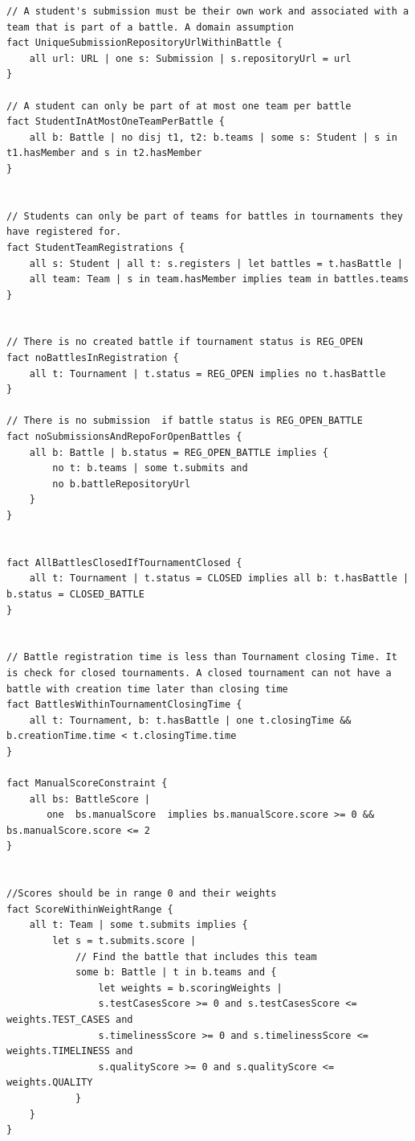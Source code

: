 \begin{lstlisting}[language=alloy]
// A student's submission must be their own work and associated with a team that is part of a battle. A domain assumption
fact UniqueSubmissionRepositoryUrlWithinBattle {
    all url: URL | one s: Submission | s.repositoryUrl = url
}

// A student can only be part of at most one team per battle
fact StudentInAtMostOneTeamPerBattle {
    all b: Battle | no disj t1, t2: b.teams | some s: Student | s in t1.hasMember and s in t2.hasMember
}


// Students can only be part of teams for battles in tournaments they have registered for.
fact StudentTeamRegistrations {
    all s: Student | all t: s.registers | let battles = t.hasBattle |
    all team: Team | s in team.hasMember implies team in battles.teams
}


// There is no created battle if tournament status is REG_OPEN
fact noBattlesInRegistration {
    all t: Tournament | t.status = REG_OPEN implies no t.hasBattle
}

// There is no submission  if battle status is REG_OPEN_BATTLE
fact noSubmissionsAndRepoForOpenBattles {
    all b: Battle | b.status = REG_OPEN_BATTLE implies {
        no t: b.teams | some t.submits and
        no b.battleRepositoryUrl
    }
}


fact AllBattlesClosedIfTournamentClosed {
    all t: Tournament | t.status = CLOSED implies all b: t.hasBattle | b.status = CLOSED_BATTLE
}


// Battle registration time is less than Tournament closing Time. It is check for closed tournaments. A closed tournament can not have a battle with creation time later than closing time
fact BattlesWithinTournamentClosingTime {
    all t: Tournament, b: t.hasBattle | one t.closingTime && b.creationTime.time < t.closingTime.time
}

fact ManualScoreConstraint {
    all bs: BattleScore |
       one  bs.manualScore  implies bs.manualScore.score >= 0 && bs.manualScore.score <= 2
}


//Scores should be in range 0 and their weights
fact ScoreWithinWeightRange {
    all t: Team | some t.submits implies {
        let s = t.submits.score |
            // Find the battle that includes this team
            some b: Battle | t in b.teams and {
                let weights = b.scoringWeights |
                s.testCasesScore >= 0 and s.testCasesScore <= weights.TEST_CASES and
                s.timelinessScore >= 0 and s.timelinessScore <= weights.TIMELINESS and
                s.qualityScore >= 0 and s.qualityScore <= weights.QUALITY
            }
    }
}


\end{lstlisting}
